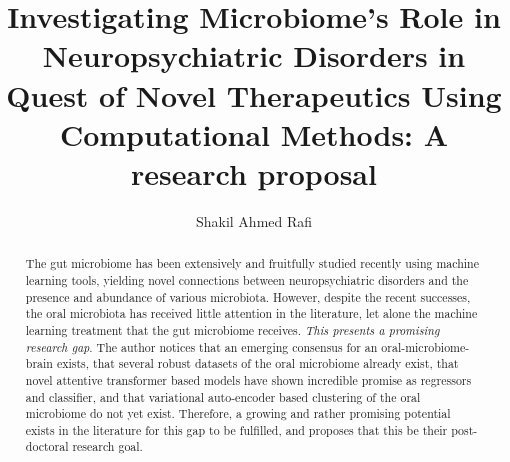 \documentclass{article}
\title{Investigating Microbiome's Role in Neuropsychiatric Disorders in Quest of Novel Therapeutics Using Computational Methods: A research proposal}
\author{Shakil Ahmed Rafi}
\begin{document}
\maketitle
\begin{abstract}
	The gut microbiome has been extensively and fruitfully studied recently using machine learning tools, yielding novel connections between neuropsychiatric disorders and the presence and abundance of various microbiota. However, despite the recent successes, the oral microbiota has received little attention in the literature, let alone the machine learning treatment that the gut microbiome receives. \textit{This presents a promising research gap}. The author notices that an emerging consensus for an oral-microbiome-brain exists, that several robust datasets of the oral microbiome already exist, that novel attentive transformer based models  have shown incredible promise as regressors and classifier, and that variational auto-encoder based clustering of the oral microbiome do not yet exist. Therefore, a growing and rather promising potential exists in the literature for this gap to be fulfilled, and proposes that this be their post-doctoral research goal.
\end{abstract}
\noindent
\end{document}
